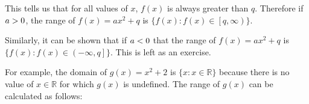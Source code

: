          \label{m39345*id242387}This tells us that for all values of $x$, $f\left(x\right)$ is always greater than $q$. Therefore if $a>{}0$, the range of $f\left(x\right)=a{x}^{2}+q$ is $\{f\left(x\right):f\left(x\right)\in \left[q,\infty \right)\}$.\par 
          \label{m39345*id242519}Similarly, it can be shown that if $a<{}0$ that the range of $f\left(x\right)=a{x}^{2}+q$ is $\{f\left(x\right):f\left(x\right)\in \left(-\infty ,q\right]\}$. This is left as an exercise.\par 
          \label{m39345*id242620}For example, the domain of $g\left(x\right)={x}^{2}+2$ is $\{x:x\in \mathbb{R}\}$ because there is no value of $x\in \mathbb{R}$ for which $g\left(x\right)$ is undefined. The range of $g\left(x\right)$ can be calculated as follows:\par 
